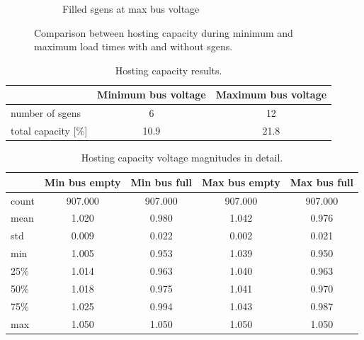 \documentclass[a4paper,10pt]{report}
\begin{document}
\begin{figure}
\begin{subfigure}[b]{0.475\textwidth}
		\caption[]%
		{{\small Filled sgens at max bus voltage}}    
		\label{fig:mean and std of net44}
	\end{subfigure}
	\caption[Comparison of hosting capacities for time extremes]
	{\small Comparison between hosting capacity during minimum and maximum load times with and without sgens.} 
	\label{fig:mean and std of nets}
\end{figure}

\begin{table}[htpb]
	\centering
	\begin{tabular}{lcc}
		\toprule
		& Minimum bus voltage & Maximum bus voltage \\
		\midrule
		number of sgens & 6 & 12 \\
		total capacity [\%] & 10.9 & 21.8 \\
		\bottomrule
	\end{tabular}
	\caption[Hosting capacity results]{Hosting capacity results.}
	\label{hosting_cap_stats}
\end{table}

\begin{table}[htpb]
	\centering
	\begin{tabular}{lcccc}
		\toprule
		& Min bus empty & Min bus full & Max bus empty & Max bus full \\
		\midrule
		count & 907.000 & 907.000 & 907.000 & 907.000 \\
		mean & 1.020 & 0.980 & 1.042 & 0.976 \\
		std & 0.009 & 0.022 & 0.002 & 0.021 \\
		min & 1.005 & 0.953 & 1.039 & 0.950 \\
		25\% & 1.014 & 0.963 & 1.040 & 0.963 \\
		50\% & 1.018 & 0.975 & 1.041 & 0.970 \\
		75\% & 1.025 & 0.994 & 1.043 & 0.987 \\
		max & 1.050 & 1.050 & 1.050 & 1.050 \\
		\bottomrule
	\end{tabular}
	\caption[Hosting capacity voltage magnitudes in detail]{Hosting capacity voltage magnitudes in detail.}
	\label{extremes_summary}
\end{table}
\end{document}
